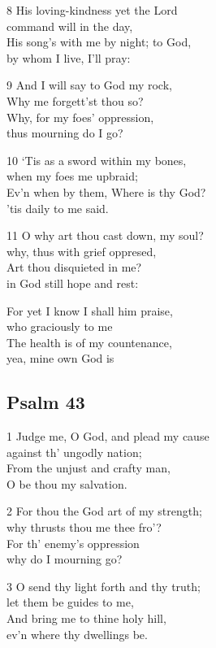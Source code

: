 8 His loving-kindness yet the Lord\\
command will in the day,\\
His song’s with me by night; to God,\\
by whom I live, I’ll pray:

9 And I will say to God my rock,\\
Why me forgett’st thou so?\\
Why, for my foes’ oppression,\\
thus mourning do I go?

10 ‘Tis as a sword within my bones,\\
when my foes me upbraid;\\
Ev’n when by them, Where is thy God?\\
’tis daily to me said.

11 O why art thou cast down, my soul?\\
why, thus with grief oppresed,\\
Art thou disquieted in me?\\
in God still hope and rest:

For yet I know I shall him praise,\\
who graciously to me\\
The health is of my countenance,\\
yea, mine own God is 

\begin{center}
\quad{}\quad{}
\end{center}

\subsection*{Psalm 43}

1 Judge me, O God, and plead my cause\\
against th’ ungodly nation;\\
From the unjust and crafty man,\\
O be thou my salvation.

2 For thou the God art of my strength;\\
why thrusts thou me thee fro’?\\
For th’ enemy’s oppression\\
why do I mourning go?

3 O send thy light forth and thy truth;\\
let them be guides to me,\\
And bring me to thine holy hill,\\
ev’n where thy dwellings be.

